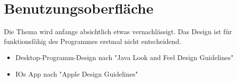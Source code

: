 \chapter{Benutzungsoberfläche}
	Die Thema wird anfangs absichtlich etwas vernachlässigt. Das Design ist für funktionsfähig des Programmes erstmal nicht entscheidend.
	\begin{itemize}
 
		\item Desktop-Programm-Design nach "Java Look and Feel Design Guidelines"
		\item IOs App nach "Apple Design Guidelines"
	\end{itemize}
	
